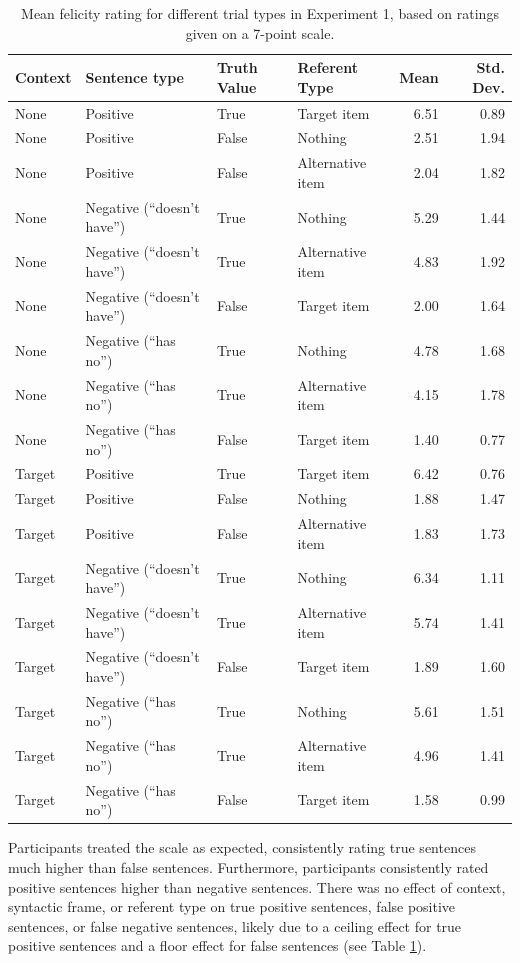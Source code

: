 \documentclass[man, noapacite]{apa2}
\begin{document}
\begin{table}
\caption{\label{tab:m1} Mean felicity rating for different trial types in Experiment 1, based on ratings given on a 7-point scale.}
\begin{center}
\small\addtolength{\tabcolsep}{-5pt}
\begin{tabular}{llllrr}
 \hline
 Context & Sentence type & Truth Value & Referent Type & Mean & Std. Dev. \\
 \hline
 None & Positive & True & Target item & 6.51 & 0.89\\
 None & Positive & False & Nothing & 2.51 & 1.94\\
 None & Positive & False & Alternative item & 2.04 & 1.82\\
 None & Negative (``doesn't have'') & True & Nothing & 5.29 & 1.44\\
 None & Negative (``doesn't have'') & True & Alternative item & 4.83 & 1.92\\
 None & Negative (``doesn't have'') & False & Target item & 2.00 & 1.64\\
 None & Negative (``has no'') & True & Nothing & 4.78 & 1.68\\
 None & Negative (``has no'') & True & Alternative item & 4.15 & 1.78\\
 None & Negative (``has no'') & False & Target item & 1.40 & 0.77\\
 Target & Positive & True & Target item & 6.42 & 0.76\\
 Target& Positive & False & Nothing & 1.88 & 1.47\\
 Target & Positive & False & Alternative item & 1.83 & 1.73\\
 Target & Negative (``doesn't have'') & True & Nothing & 6.34 & 1.11\\
 Target & Negative (``doesn't have'') & True & Alternative item & 5.74 & 1.41\\
 Target & Negative (``doesn't have'') & False & Target item & 1.89 & 1.60\\
 Target & Negative (``has no'') & True & Nothing & 5.61 & 1.51\\
 Target & Negative (``has no'') & True & Alternative item & 4.96 & 1.41\\
 Target & Negative (``has no'') & False & Target item & 1.58 & 0.99\\
  \hline
\end{tabular}
\end{center}
\end{table}

Participants treated the scale as expected, consistently rating true sentences much higher than false sentences.  Furthermore, participants consistently rated positive sentences higher than negative sentences. There was no effect of context, syntactic frame, or referent type on true positive sentences, false positive sentences, or false negative sentences, likely due to a ceiling effect for true positive sentences and a floor effect for false sentences (see Table \ref{tab:m1}).
\end{document}
